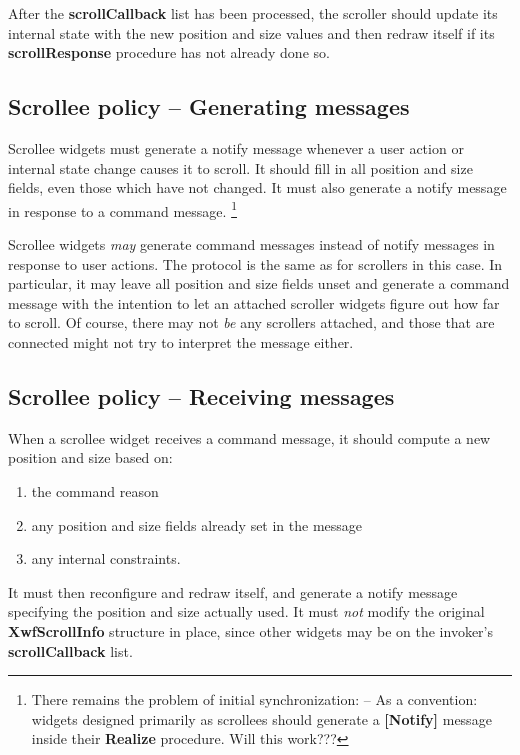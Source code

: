 After the {\bf scrollCallback} list has been processed, the scroller should
update its internal state with the new position and size values and
then redraw itself if its {\bf scrollResponse} procedure has not already
done so.


\subsection{Scrollee policy -- Generating messages}

Scrollee widgets must generate a notify message whenever a user action
or internal state change causes it to scroll.  It should fill in all
position and size fields, even those which have not changed.  It must
also generate a notify message in response to a command message.
\footnote{There remains the problem of initial synchronization: --
As a convention: widgets designed primarily as scrollees should generate
a {\bf [Notify]} message inside their {\bf Realize} procedure. Will this
work???}

Scrollee widgets {\it may}\/ generate command messages instead of notify
messages in response to user actions.  The protocol is the same as for
scrollers in this case.  In particular, it may leave all position and
size fields unset and generate a command message with the intention to
let an attached scroller widgets figure out how far to scroll. Of
course, there may not {\it be}\/ any scrollers attached, and those that are
connected might not try to interpret the message either.


\subsection{Scrollee policy -- Receiving messages}

When a scrollee widget receives a command message, it should compute a
new position and size based on:

\begin{enumerate}

\item
the command reason

\item
any position and size fields already set in the message

\item
any internal constraints.

\end{enumerate}

It must then reconfigure and redraw itself, and generate a notify
message specifying the position and size actually used.  It must {\it not}\/
modify the original {\bf XwfScrollInfo} structure in place, since other
widgets may be on the invoker's {\bf scrollCallback} list.

